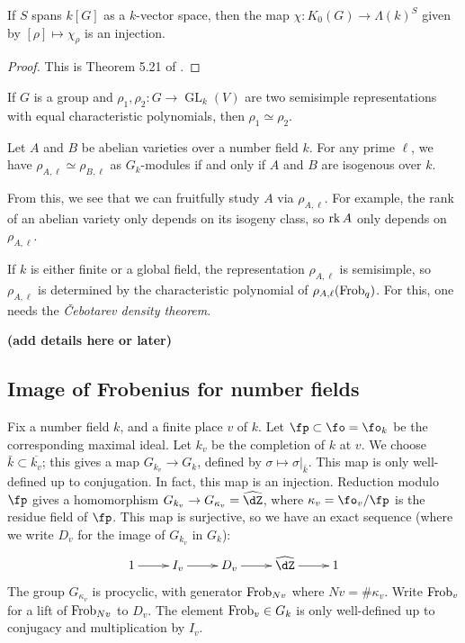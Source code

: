 \begin{theorem}
If $S$ spans $k[G]$ as a $k$-vector space, then the map 
$\chi:K_0(G) \to \Lambda(k)^S$ given by $[\rho]\mapsto \chi_\rho$ is an 
injection. 
\end{theorem}
\begin{proof}
This is Theorem 5.21 of \cite{eg11}. 
\end{proof}

\begin{corollary}
If $G$ is a group and $\rho_1,\rho_2:G \to \operatorname{GL}_k(V)$ are two 
semisimple representations with equal characteristic polynomials, then 
$\rho_1\simeq \rho_2$. 
\end{corollary}







\begin{theorem}
Let $A$ and $B$ be abelian varieties over a number field $k$. For any prime 
$\ell$, we have $\rho_{A,\ell}\simeq \rho_{B,\ell}$ as $G_k$-modules if and 
only if $A$ and $B$ are isogenous over $k$. 
\end{theorem}

From this, we see that we can fruitfully study $A$ via $\rho_{A,\ell}$. For 
example, the rank of an abelian variety only depends on its isogeny class, so 
$\operatorname{rk} A$ only depends on $\rho_{A,\ell}$. 

If $k$ is either finite or a global field, the representation $\rho_{A,\ell}$ 
is semisimple, so $\rho_{A,\ell}$ is determined by the characteristic 
polynomial of $\rho_{A,\ell}(\mathrm{Frob}_q)$. For this, one needs the 
\emph{\v Cebotarev density theorem}. 

\textbf{(add details here or later)}





\subsection{Image of Frobenius for number fields}

Fix a number field $k$, and a finite place $v$ of $k$. Let 
$\fp\subset \fo=\fo_k$ be the corresponding maximal ideal. Let $k_v$ be the 
completion of $k$ at $v$. We choose $\bar k\subset \overline{k_v}$; this gives 
a map $G_{k_v} \to G_k$, defined by $\sigma\mapsto \sigma|_{\bar k}$. This map 
is only well-defined up to conjugation. In fact, this map is an injection. 
Reduction modulo $\fp$ gives a homomorphism 
$G_{k_v} \to G_{\kappa_v}=\widehat\dZ$, where $\kappa_v = \fo_v/\fp$ is the 
residue field of $\fp$. This map is surjective, so we have an exact sequence 
(where we write $D_v$ for the image of $G_{k_v}$ in $G_k$):
\[\xymatrix{
  1 \ar[r] 
    & I_v \ar[r] 
    & D_v \ar[r] 
    & \widehat\dZ \ar[r] 
    & 1
}\]
The group $G_{\kappa_v}$ is procyclic, with generator 
$\mathrm{Frob}_{N v}$ where $N v = \# \kappa_v$. Write $\mathrm{Frob}_v$ for a lift of 
$\mathrm{Frob}_{N v}$ to $D_v$. The element $\mathrm{Frob}_v\in G_k$ is only well-defined up to 
conjugacy and multiplication by $I_v$. 

